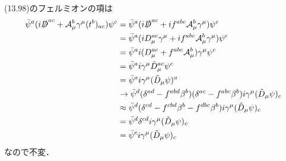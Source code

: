(13.98)のフェルミオンの項は
\begin{align*}
 \bar\psi^a (i\slashed{D}^{ac} + \mathcal{A}^b_\mu \gamma^\mu (t^b)_{ac}) \psi^c
  &= \bar\psi^a (i\slashed{D}^{ac} + if^{abc}\mathcal{A}^b_\mu \gamma^\mu) \psi^c \\
  &= \bar\psi^a (iD_\mu^{ac} \gamma^\mu + if^{abc}\mathcal{A}^b_\mu \gamma^\mu) \psi^c \\
  &= \bar\psi^a i (D_\mu^{ac} + f^{abc}\mathcal{A}^b_\mu ) \gamma^\mu \psi^c \\
  &= \bar\psi^a i\gamma^\mu \tilde{D}_\mu^{ac} \psi^c \\
  &= \bar\psi^a i\gamma^\mu (\tilde{D}_\mu\psi)^a \\
  &\to \bar\psi^d (\delta^{ad} - f^{abd} \beta^b) (\delta^{ac} - f^{abc} \beta^b) i\gamma^\mu (\tilde{D}_\mu\psi)_c \\
  &\approx \bar\psi^d (\delta^{cd} - f^{cbd} \beta^b - f^{dbc} \beta^b ) i\gamma^\mu (\tilde{D}_\mu\psi)_c \\
  &= \bar\psi^d \delta^{cd} i\gamma^\mu (\tilde{D}_\mu\psi)_c \\
  &= \bar\psi^c i\gamma^\mu (\tilde{D}_\mu\psi)_c
\end{align*}
なので不変．

